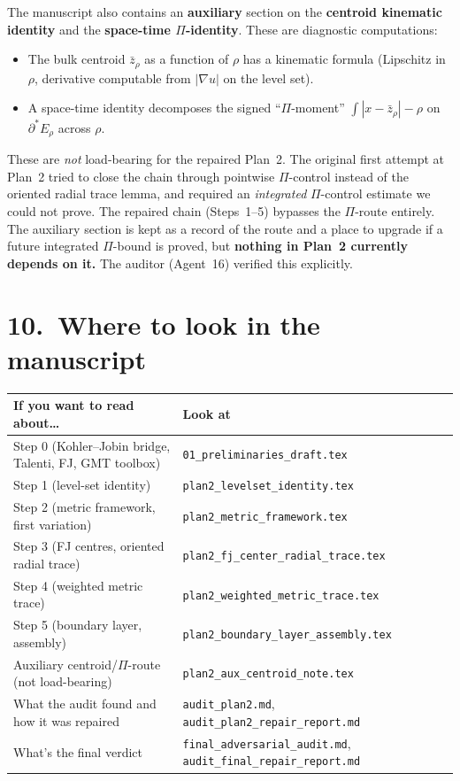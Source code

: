 \documentclass[11pt,a4paper]{article}
\newcommand{\Erho}{E_\rho}
\begin{document}
The manuscript also contains an \textbf{auxiliary} section on the \textbf{centroid kinematic identity} and the \textbf{space-time $\Pi$-identity}. These are diagnostic computations:
\begin{itemize}[leftmargin=*]
\item The bulk centroid $\bar z_\rho$ as a function of $\rho$ has a kinematic formula (Lipschitz in $\rho$, derivative computable from $|\nabla u|$ on the level set).
\item A space-time identity decomposes the signed ``$\Pi$-moment'' $\int |x - \bar z_\rho| - \rho$ on $\partial^* \Erho$ across $\rho$.
\end{itemize}
These are \emph{not} load-bearing for the repaired Plan~2. The original first attempt at Plan~2 tried to close the chain through pointwise $\Pi$-control instead of the oriented radial trace lemma, and required an \emph{integrated} $\Pi$-control estimate we could not prove. The repaired chain (Steps~1--5) bypasses the $\Pi$-route entirely. The auxiliary section is kept as a record of the route and a place to upgrade if a future integrated $\Pi$-bound is proved, but \textbf{nothing in Plan~2 currently depends on it.} The auditor (Agent~16) verified this explicitly.

\section*{10.\ Where to look in the manuscript}

\begin{center}
\begin{tabularx}{\linewidth}{@{}l X@{}}
\toprule
\textbf{If you want to read about\ldots} & \textbf{Look at}\\
\midrule
Step 0 (Kohler--Jobin bridge, Talenti, FJ, GMT toolbox) & \texttt{01\_preliminaries\_draft.tex}\\
Step 1 (level-set identity) & \texttt{plan2\_levelset\_identity.tex}\\
Step 2 (metric framework, first variation) & \texttt{plan2\_metric\_framework.tex}\\
Step 3 (FJ centres, oriented radial trace) & \texttt{plan2\_fj\_center\_radial\_trace.tex}\\
Step 4 (weighted metric trace) & \texttt{plan2\_weighted\_metric\_trace.tex}\\
Step 5 (boundary layer, assembly) & \texttt{plan2\_boundary\_layer\_assembly.tex}\\
Auxiliary centroid/$\Pi$-route (not load-bearing) & \texttt{plan2\_aux\_centroid\_note.tex}\\
What the audit found and how it was repaired & \texttt{audit\_plan2.md}, \texttt{audit\_plan2\_repair\_report.md}\\
What's the final verdict & \texttt{final\_adversarial\_audit.md}, \texttt{audit\_final\_repair\_report.md}\\
\bottomrule
\end{tabularx}
\end{center}
\end{document}
